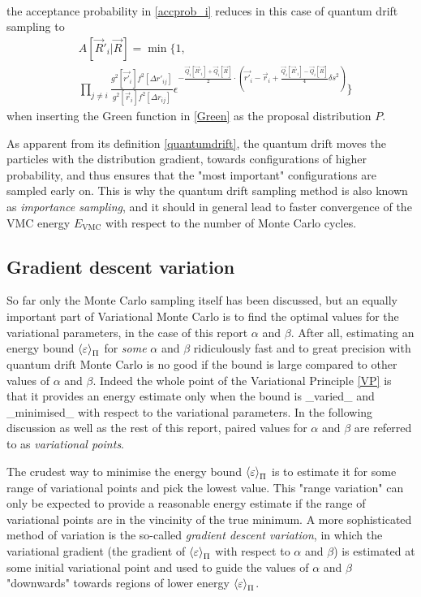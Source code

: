 \documentclass[a4paper,8pt]{article}
\begin{document}
\begin{multicols}{2}
\begin{align}
\end{align}
the acceptance probability in \eqref{accprob_i} reduces in this case of quantum drift sampling to
\begin{align}
&A[\vec{R}'_i|\vec{R}] = \min\Bigg\{1, \nonumber\\
&\prod\limits_{j \neq i} \frac{g^2[\vec{r'}_i]f^2[\Delta r'_{ij}]}{g^2[\vec{r}_i]f^2[\Delta r_{ij}]}\epsilon^{-\frac{\vec{Q}_i[\vec{R}'_i]+\vec{Q}_i[\vec{R}]}{2}\cdot\left(\vec{r'}_i-\vec{r}_i+\frac{\vec{Q}_i[\vec{R}'_i]-\vec{Q}_i[\vec{R}]}{4}\delta s^2\right)}\Bigg\} \label{accLD}
\end{align}
when inserting the Green function in \eqref{Green} as the proposal distribution $P$.

As apparent from its definition \eqref{quantumdrift}, the quantum drift moves the particles with the distribution gradient, towards configurations of higher probability, and thus ensures that the "most important" configurations are sampled early on. This is why the quantum drift sampling method is also known as \textit{importance sampling}, and it should in general lead to faster convergence of the VMC energy $E_\text{VMC}$ with respect to the number of Monte Carlo cycles.


\subsection{Gradient descent variation}\label{gradientdescent}
So far only the Monte Carlo sampling itself has been discussed, but an equally important part of Variational Monte Carlo is to find the optimal values for the variational parameters, in the case of this report $\alpha$ and $\beta$. After all, estimating an energy bound $\ev{\varepsilon}_\Pi$ for \textit{some} $\alpha$ and $\beta$ ridiculously fast and to great precision with quantum drift Monte Carlo is no good if the bound is large compared to other values of $\alpha$ and $\beta$. Indeed the whole point of the Variational Principle \eqref{VP} is that it provides an energy estimate only when the bound is \_varied\_ and \_minimised\_ with respect to the variational parameters. In the following discussion as well as the rest of this report, paired values for $\alpha$ and $\beta$ are referred to as \textit{variational points}.

The crudest way to minimise the energy bound $\ev{\varepsilon}_\Pi$ is to estimate it for some range of variational points and pick the lowest value. This "range variation" can only be expected to provide a reasonable energy estimate if the range of variational points are in the vincinity of the true minimum. A more sophisticated method of variation is the so-called \textit{gradient descent variation}, in which the variational gradient (the gradient of $\ev{\varepsilon}_\Pi$ with respect to $\alpha$ and $\beta$) is estimated at some initial variational point and used to guide the values of $\alpha$ and $\beta$ "downwards" towards regions of lower energy $\ev{\varepsilon}_\Pi$.


\end{multicols}
\end{document}
